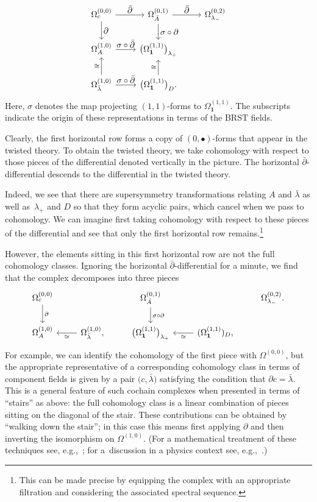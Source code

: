 \documentclass[pdftex]{sigma}
\numberwithin{equation}{section}
\theoremstyle{definition}
\begin{document}
\[
 \begin{tikzcd}
 \Omega^{(0,0)}_c \arrow[d, "\textstyle\partial"] \arrow[r, "\textstyle \bar{\partial}"] & \Omega^{(0,1)}_{\bar{A}} \arrow[r, "\textstyle\bar{\partial}"] \arrow[d, "\textstyle\sigma \circ \partial"] & \Omega^{(0,2)}_{\lambda_-} \\
 \Omega^{(1,0)}_A \arrow[r, "\textstyle\sigma \circ \bar{\partial}"] & \big(\Omega^{(1,1)}_\textbf{1}\big)_{\lambda_+} \\
 \Omega^{(1,0)}_{\bar{\lambda}} \arrow[u, "\cong"] \arrow[r, "\textstyle \sigma \circ \bar{\partial}"] & \big(\Omega^{(1,1)}_\textbf{1}\big)_{D} \arrow[u, "\cong"].
 \end{tikzcd}
\]
Here, $\sigma$ denotes the map projecting $(1,1)$-forms to $\Omega^{(1,1)}_\textbf{1}$. The subscripts indicate the origin of these representations in terms of the BRST fields.

Clearly, the first horizontal row forms a copy of $(0,\bullet)$-forms that appear in the twisted theory. To obtain the twisted theory, we take cohomology with respect to those pieces of the differential denoted vertically in the picture. The horizontal $\bar{\partial}$-differential descends to the differential in the twisted theory.

Indeed, we see that there are supersymmetry transformations relating $A$ and $\bar{\lambda}$ as well as~$\lambda_+$ and $D$ so that they form acyclic pairs, which cancel when we pass to cohomology. We can imagine first taking cohomology with respect to these pieces of the differential and see that only the first horizontal row remains.\footnote{This can be made precise by equipping the complex with an appropriate filtration and considering the associated spectral sequence.}

However, the elements sitting in this first horizontal row are not the full cohomology classes. Ignoring the horizontal $\bar{\partial}$-differential for a minute, we find that the complex decomposes into three pieces
\[
 \begin{tikzcd}
 \Omega^{(0,0)}_c \arrow[d, "\partial"] & & \Omega^{(0,1)}_{\bar{A}} \arrow[d, "\sigma \circ \partial"] & & \Omega^{(0,2)}_{\lambda_-}. \\
 \Omega^{(1,0)}_A & \Omega^{(1,0)}_{\bar{\lambda}} \arrow[l, "\cong"], & \big(\Omega^{(1,1)}_\textbf{1}\big)_{\lambda_+} & (\Omega^{(1,1)}_\textbf{1})_{D} \arrow[l,"\cong"],
 \end{tikzcd}
\]
For example, we can identify the cohomology of the first piece with $\Omega^{(0,0)}$, but the appropriate representative of a corresponding cohomology class in terms of component fields is given by a pair $\big(c, \bar{\lambda}\big)$ satisfying the condition that $\partial c = \bar{\lambda}$. This is a general feature of such cochain complexes when presented in terms of ``stairs'' as above: the full cohomology class is a linear combination of pieces sitting on the diagonal of the stair. These contributions can be obtained by ``walking down the stair''; in this case this means first applying $\partial$ and then inverting the isomorphism on $\Omega^{(1,0)}$. (For a mathematical treatment of these techniques see, e.g.,~\cite{Stelzig}; for a~discussion in a physics context see, e.g.,~\cite{BPS-SS}.)
\end{document}
